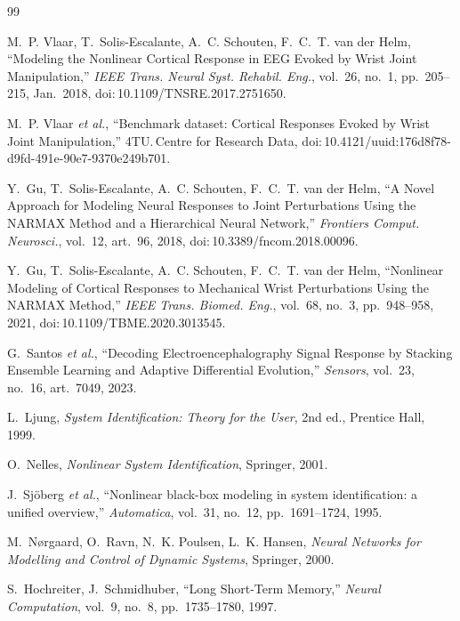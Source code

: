 \documentclass[conference]{IEEEtran}
\begin{document}
\begin{thebibliography}{99}

M.~P. Vlaar, T.~Solis-Escalante, A.~C. Schouten, F.~C.~T. van der Helm,
``Modeling the Nonlinear Cortical Response in EEG Evoked by Wrist
Joint Manipulation,'' \textit{IEEE Trans. Neural Syst. Rehabil. Eng.},
vol.~26, no.~1, pp.~205--215, Jan.~2018,
doi:\,10.1109/TNSRE.2017.2751650.

M.~P. Vlaar \textit{et al.}, ``Benchmark dataset: Cortical
Responses Evoked by Wrist Joint Manipulation,'' 4TU.\,Centre for
Research Data, doi:\,10.4121/uuid:176d8f78-d9fd-491e-90e7-9370e249b701.

Y.~Gu, T.~Solis-Escalante, A.~C. Schouten, F.~C.~T. van der Helm,
``A Novel Approach for Modeling Neural Responses to Joint
Perturbations Using the NARMAX Method and a Hierarchical Neural
Network,'' \textit{Frontiers Comput. Neurosci.}, vol.~12, art.~96, 2018,
doi:\,10.3389/fncom.2018.00096.

Y.~Gu, T.~Solis-Escalante, A.~C. Schouten, F.~C.~T. van der Helm,
``Nonlinear Modeling of Cortical Responses to Mechanical Wrist
Perturbations Using the NARMAX Method,'' \textit{IEEE Trans. Biomed.
Eng.}, vol.~68, no.~3, pp.~948--958, 2021,
doi:\,10.1109/TBME.2020.3013545.

G.~Santos \textit{et al.}, ``Decoding Electroencephalography Signal
Response by Stacking Ensemble Learning and Adaptive Differential
Evolution,'' \textit{Sensors}, vol.~23, no.~16, art.~7049, 2023.

L.~Ljung, \textit{System Identification: Theory for the User}, 2nd ed.,
Prentice Hall, 1999.

O.~Nelles, \textit{Nonlinear System Identification}, Springer, 2001.

J.~Sj\"oberg \textit{et al.}, ``Nonlinear black-box modeling in
system identification: a unified overview,'' \textit{Automatica},
vol.~31, no.~12, pp.~1691--1724, 1995.

M.~N{\o}rgaard, O.~Ravn, N.~K. Poulsen, L.~K. Hansen,
\textit{Neural Networks for Modelling and Control of Dynamic Systems},
Springer, 2000.

S.~Hochreiter, J.~Schmidhuber, ``Long Short-Term Memory,''
\textit{Neural Computation}, vol.~9, no.~8, pp.~1735--1780, 1997.


\end{thebibliography}
\end{document}
